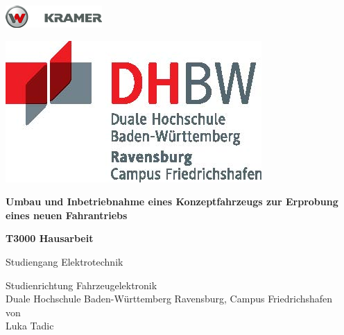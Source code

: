 \documentclass[a4paper, 12pt]{article} %
\newcommand{\titel}{Umbau und Inbetriebnahme eines Konzeptfahrzeugs zur Erprobung eines neuen Fahrantriebs}
\newcommand{\arbeit}{T3000 Hausarbeit}
\newcommand{\studiengang}{Elektrotechnik}
\newcommand{\studienrichtung}{Fahrzeugelektronik}
\newcommand{\autor}{Luka Tadic}
\begin{document}
\sloppy

\thispagestyle{empty}  %
\hypersetup{pageanchor=false}

\begin{titlepage}
\enlargethispage{4.0cm}
\sffamily  %

\parbox{0.5\linewidth}{%
    \begin{flushleft}
        \includegraphics[width=0.4\linewidth]{images/kramer.png}\\[5ex] %
    \end{flushleft}
}
\parbox{0.5\linewidth}{%
    \begin{flushright}
        \includegraphics[width=0.4\linewidth]{images/DHBW_d_R_FN_46mm_4c}\\[5ex] %
    \end{flushright}
}

\begin{center}

{\fontsize{20.74pt}{24pt}\selectfont
\textbf{\titel}\\[1.5ex]}

{\fontsize{17pt}{20pt}\selectfont
\textbf{\arbeit}\\[2ex]}

{\fontsize{14pt}{17pt}\selectfont
Studiengang \studiengang\\[2ex]}

{\fontsize{12pt}{14pt}\selectfont
Studienrichtung \studienrichtung\\[1ex]
Duale Hochschule Baden-Württemberg Ravensburg, Campus Friedrichshafen\\[5ex]
von\\[1ex]
\autor\\[15ex]}


\end{center}
\end{titlepage}
\end{document}
